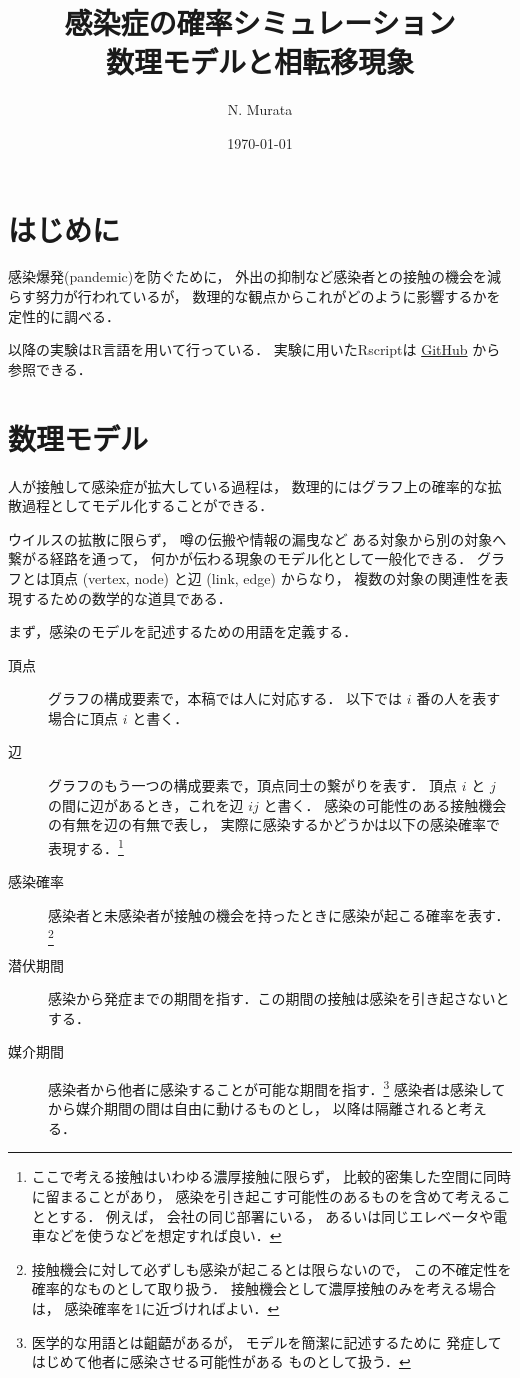 \documentclass[10pt,oneside]{scrartcl}
\author{N. Murata}
\date{\today}
\title{感染症の確率シミュレーション\\\medskip
\large 数理モデルと相転移現象}
\begin{document}
\maketitle

\section{はじめに}
\label{sec:orgcacc09a}

感染爆発(pandemic)を防ぐために，
外出の抑制など感染者との接触の機会を減らす努力が行われているが，
数理的な観点からこれがどのように影響するかを定性的に調べる．

以降の実験はR言語を用いて行っている．
実験に用いたRscriptは
\href{https://github.com/noboru-murata/epidemic-model}{GitHub}
から参照できる．

\section{数理モデル}
\label{sec:orga80aa20}
人が接触して感染症が拡大している過程は，
数理的にはグラフ上の確率的な拡散過程としてモデル化することができる．

ウイルスの拡散に限らず，
噂の伝搬や情報の漏曳など
ある対象から別の対象へ繋がる経路を通って，
何かが伝わる現象のモデル化として一般化できる．
グラフとは頂点 (vertex, node) と辺 (link, edge) からなり，
複数の対象の関連性を表現するための数学的な道具である．

まず，感染のモデルを記述するための用語を定義する．
\begin{description}
\item[{頂点}] グラフの構成要素で，本稿では人に対応する．
以下では \(i\) 番の人を表す場合に頂点 \(i\) と書く．
\item[{辺}] グラフのもう一つの構成要素で，頂点同士の繋がりを表す．
頂点 \(i\) と \(j\) の間に辺があるとき，これを辺 \(ij\) と書く．
感染の可能性のある接触機会の有無を辺の有無で表し，
実際に感染するかどうかは以下の感染確率で表現する．\footnote{ここで考える接触はいわゆる濃厚接触に限らず，
比較的密集した空間に同時に留まることがあり，
感染を引き起こす可能性のあるものを含めて考えることとする．
例えば，
会社の同じ部署にいる，
あるいは同じエレベータや電車などを使うなどを想定すれば良い．}
\item[{感染確率}] 感染者と未感染者が接触の機会を持ったときに感染が起こる確率を表す．\footnote{接触機会に対して必ずしも感染が起こるとは限らないので，
この不確定性を確率的なものとして取り扱う．
接触機会として濃厚接触のみを考える場合は，
感染確率を1に近づければよい．}
\item[{潜伏期間}] 感染から発症までの期間を指す．この期間の接触は感染を引き起さないとする．
\item[{媒介期間}] 感染者から他者に感染することが可能な期間を指す．\footnote{医学的な用語とは齟齬があるが，
モデルを簡潔に記述するために
発症してはじめて他者に感染させる可能性がある
ものとして扱う．}
感染者は感染してから媒介期間の間は自由に動けるものとし，
以降は隔離されると考える．
\end{description}
\end{document}
